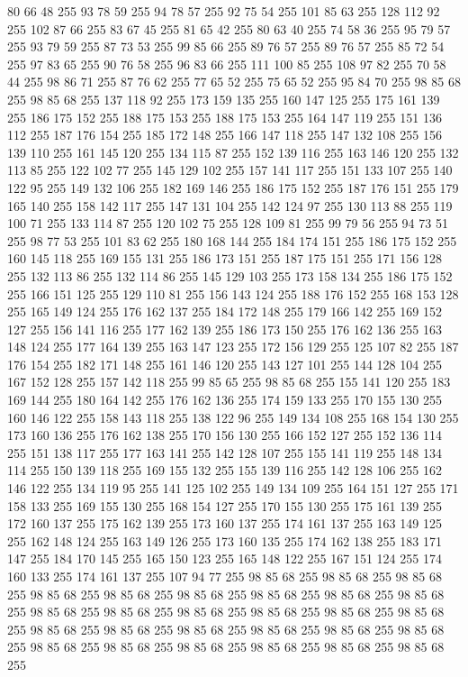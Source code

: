 80 66 48 255 93 78 59 255 94 78 57 255 92 75 54 255 101 85 63 255 128 112 92 255 102 87 66 255 83 67 45 255 81 65 42 255 80 63 40 255 74 58 36 255 95 79 57 255 93 79 59 255 87 73 53 255 99 85 66 255 89 76 57 255 89 76 57 255 85 72 54 255 97 83 65 255 90 76 58 255 96 83 66 255 111 100 85 255 108 97 82 255 70 58 44 255 98 86 71 255 87 76 62 255 77 65 52 255 75 65 52 255 95 84 70 255 98 85 68 255 98 85 68 255 137 118 92 255 173 159 135 255 160 147 125 255 175 161 139 255 186 175 152 255 188 175 153 255 188 175 153 255 164 147 119 255 151 136 112 255 187 176 154 255 185 172 148 255 166 147 118 255 147 132 108 255 156 139 110 255 161 145 120 255 134 115 87 255 152 139 116 255 163 146 120 255 132 113 85 255 122 102 77 255 145 129 102 255 157 141 117 255 151 133 107 255 140 122 95 255 149 132 106 255 182 169 146 255 186 175 152 255 187 176 151 255 179 165 140 255 158 142 117 255 147 131 104 255 142 124 97 255 130 113 88 255
119 100 71 255 133 114 87 255 120 102 75 255 128 109 81 255 99 79 56 255 94 73 51 255 98 77 53 255 101 83 62 255 180 168 144 255 184 174 151 255 186 175 152 255 160 145 118 255 169 155 131 255 186 173 151 255 187 175 151 255 171 156 128 255 132 113 86 255 132 114 86 255 145 129 103 255 173 158 134 255 186 175 152 255 166 151 125 255 129 110 81 255 156 143 124 255 188 176 152 255 168 153 128 255 165 149 124 255 176 162 137 255 184 172 148 255 179 166 142 255 169 152 127 255 156 141 116 255 177 162 139 255 186 173 150 255 176 162 136 255 163 148 124 255 177 164 139 255 163 147 123 255 172 156 129 255 125 107 82 255 187 176 154 255 182 171 148 255 161 146 120 255 143 127 101 255 144 128 104 255 167 152 128 255 157 142 118 255 99 85 65 255 98 85 68 255 155 141 120 255 183 169 144 255 180 164 142 255 176 162 136 255 174 159 133 255 170 155 130 255 160 146 122 255 158 143 118 255 138 122 96 255 149 134 108 255 168 154 130 255 173 160 136 255 176 162 138 255 170 156 130 255 166 152 127 255
152 136 114 255 151 138 117 255 177 163 141 255 142 128 107 255 155 141 119 255 148 134 114 255 150 139 118 255 169 155 132 255 155 139 116 255 142 128 106 255 162 146 122 255 134 119 95 255 141 125 102 255 149 134 109 255 164 151 127 255 171 158 133 255 169 155 130 255 168 154 127 255 170 155 130 255 175 161 139 255 172 160 137 255 175 162 139 255 173 160 137 255 174 161 137 255 163 149 125 255 162 148 124 255 163 149 126 255 173 160 135 255 174 162 138 255 183 171 147 255 184 170 145 255 165 150 123 255 165 148 122 255 167 151 124 255 174 160 133 255 174 161 137 255 107 94 77 255 98 85 68 255 98 85 68 255 98 85 68 255 98 85 68 255 98 85 68 255 98 85 68 255 98 85 68 255 98 85 68 255 98 85 68 255 98 85 68 255 98 85 68 255 98 85 68 255 98 85 68 255 98 85 68 255 98 85 68 255 98 85 68 255 98 85 68 255 98 85 68 255 98 85 68 255 98 85 68 255 98 85 68 255 98 85 68 255 98 85 68 255 98 85 68 255 98 85 68 255 98 85 68 255 98 85 68 255
